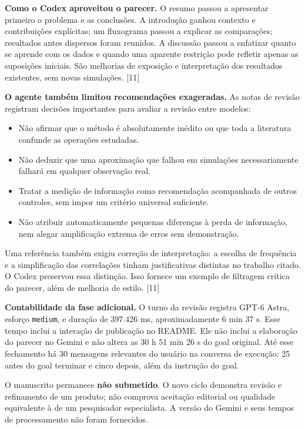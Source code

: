 \documentclass[11pt,a4paper]{article}
\newcommand{\fonte}[1]{{\small\color{navy}[#1]}}
\begin{document}
\textbf{Como o Codex aproveitou o parecer.} O resumo passou a apresentar primeiro o problema e as conclusões. A introdução ganhou contexto e contribuições explícitas; um fluxograma passou a explicar as comparações; resultados antes dispersos foram reunidos. A discussão passou a enfatizar quanto se aprende com os dados e quando uma aparente restrição pode refletir apenas as suposições iniciais. São melhorias de exposição e interpretação dos resultados existentes, sem novas simulações. \fonte{11}

\textbf{O agente também limitou recomendações exageradas.} As notas de revisão registram decisões importantes para avaliar a revisão entre modelos:
\begin{itemize}
\item Não afirmar que o método é absolutamente inédito ou que toda a literatura confunde as operações estudadas.
\item Não deduzir que uma aproximação que falhou em simulações necessariamente falhará em qualquer observação real.
\item Tratar a medição de informação como recomendação acompanhada de outros controles, sem impor um critério universal suficiente.
\item Não atribuir automaticamente pequenas diferenças à perda de informação, nem alegar amplificação extrema de erros sem demonstração.
\end{itemize}
Uma referência também exigiu correção de interpretação: a escolha de frequência e a simplificação das correlações tinham justificativas distintas no trabalho citado. O Codex preservou essa distinção. Isso fornece um exemplo de filtragem crítica do parecer, além de melhoria de estilo. \fonte{11}

\begin{destaque}
\textbf{Contabilidade da fase adicional.} O turno da revisão registra GPT-6 Astra, esforço \nolinkurl{medium}, e duração de 397.426 ms, aproximadamente 6 min 37 s. Esse tempo inclui a interação de publicação no README. Ele não inclui a elaboração do parecer no Gemini e não altera as 30 h 51 min 26 s do goal original. Até esse fechamento há 30 mensagens relevantes do usuário na conversa de execução: 25 antes do goal terminar e cinco depois, além da instrução do goal.
\end{destaque}

O manuscrito permanece \textbf{não submetido}. O novo ciclo demonstra revisão e refinamento de um produto; não comprova aceitação editorial ou qualidade equivalente à de um pesquisador especialista. A versão do Gemini e seus tempos de processamento não foram fornecidos.
\newpage
\end{document}

